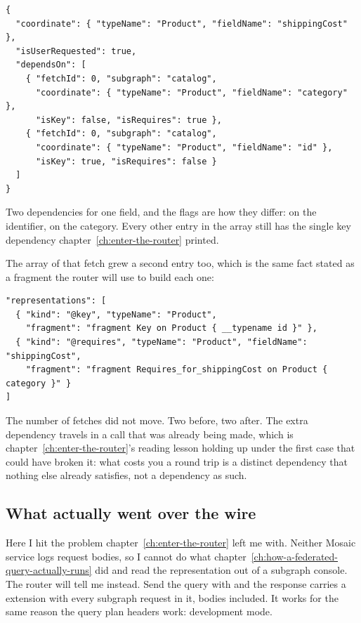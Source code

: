 \begin{verbatim}
{
  "coordinate": { "typeName": "Product", "fieldName": "shippingCost" },
  "isUserRequested": true,
  "dependsOn": [
    { "fetchId": 0, "subgraph": "catalog",
      "coordinate": { "typeName": "Product", "fieldName": "category" },
      "isKey": false, "isRequires": true },
    { "fetchId": 0, "subgraph": "catalog",
      "coordinate": { "typeName": "Product", "fieldName": "id" },
      "isKey": true, "isRequires": false }
  ]
}
\end{verbatim}

Two dependencies for one field, and the flags are how they differ:
 on the identifier,  on the category. Every other
entry in the array still has the single key dependency
chapter~\ref{ch:enter-the-router} printed.

The  array of that fetch grew a second entry too, which
is the same fact stated as a fragment the router will use to build each one:

\begin{verbatim}
"representations": [
  { "kind": "@key", "typeName": "Product",
    "fragment": "fragment Key on Product { __typename id }" },
  { "kind": "@requires", "typeName": "Product", "fieldName": "shippingCost",
    "fragment": "fragment Requires_for_shippingCost on Product { category }" }
]
\end{verbatim}

%
The number of fetches did not move. Two before, two after. The extra dependency
travels in a call that was already being made, which is
chapter~\ref{ch:enter-the-router}'s reading lesson holding up under the first
case that could have broken it: what costs you a round trip is a distinct
dependency that nothing else already satisfies, not a dependency as such.

\subsection*{What actually went over the wire}

%
Here I hit the problem chapter~\ref{ch:enter-the-router} left me with. Neither
Mosaic service logs request bodies, so I cannot do what
chapter~\ref{ch:how-a-federated-query-actually-runs} did and read the
representation out of a subgraph console. The router will tell me instead. Send
the query with  and the response carries a 
extension with every subgraph request in it, bodies included. It works for the
same reason the query plan headers work: development mode.

